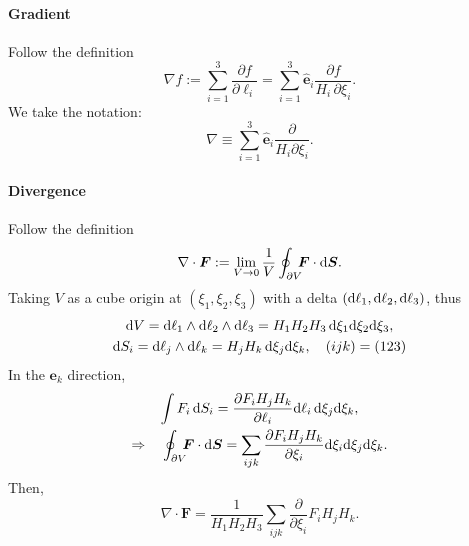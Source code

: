 \documentclass{article}
\def\d{{\rm d}}
\def\id{\,\d}%
\newcommand{\ko}[1]{\hspace{-#1 pt}}%
\newcommand{\pd}[2]{\frac{\partial #1}{\partial #2}}%
\newcommand{\ubm}[1]{\hat{\bm #1}}%
\begin{document}
\paragraph{Gradient} Follow the definition
$$\nabla f:=\sum_{i=1}^3\pd f{\bm\ell_i}=\sum_{i=1}^3\ubm e_i\frac{\partial f}{H_i\,\partial\xi_i}.$$
We take the notation:
$$\nabla\equiv\sum_{i=1}^3\ubm e_i\frac\partial{H_i\partial\xi_i}.$$
\paragraph{Divergence} Follow the definition
$$\nabla\cdot\bm F:=\lim_{V\to0}\frac1{V}\oint_{\partial V}\ko5\bm F\cdot\d\bm S.$$
Taking $V$ as a cube origin at $(\xi_1,\xi_2,\xi_3)$ with a delta $(\d\ell_1,\d\ell_2,\d\ell_3)$, thus
\begin{gather*}
	\d V=\d\ell_1\wedge\d\ell_2\wedge\d\ell_3=H_1H_2H_3\id\xi_1\d\xi_2\d\xi_3,\\
	\d S_i=\d\ell_j\wedge\d\ell_k=H_jH_k\id\xi_j\d\xi_k,\quad(ijk)=(123)
\end{gather*}
In the $\bm e_k$ direction,
\begin{gather*}
	\int F_i\id S_i=\pd{F_iH_jH_k}{\ell_i}\d\ell_i\id\xi_j\d\xi_k,\\
	\Rightarrow\quad\oint_{\partial V}\ko5\bm F\cdot\d\bm S=\sum_{ijk}\pd{F_iH_jH_k}{\xi_i}\d\xi_i\d\xi_j\d\xi_k.
\end{gather*}
Then,
$$\nabla\cdot\bm F=\frac1{H_1H_2H_3}\sum_{ijk}\pd{}{\xi_i}F_iH_jH_k.$$
\end{document}
